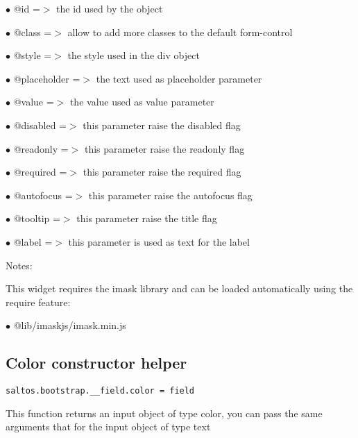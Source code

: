 \documentclass[a4paper]{book}
\begin{document}
\begin{compactitem}
\item[\color{myblue}$\bullet$] @id          =$>$ the id used by the object
\item[\color{myblue}$\bullet$] @class       =$>$ allow to add more classes to the default form-control
\item[\color{myblue}$\bullet$] @style       =$>$ the style used in the div object
\item[\color{myblue}$\bullet$] @placeholder =$>$ the text used as placeholder parameter
\item[\color{myblue}$\bullet$] @value       =$>$ the value used as value parameter
\item[\color{myblue}$\bullet$] @disabled    =$>$ this parameter raise the disabled flag
\item[\color{myblue}$\bullet$] @readonly    =$>$ this parameter raise the readonly flag
\item[\color{myblue}$\bullet$] @required    =$>$ this parameter raise the required flag
\item[\color{myblue}$\bullet$] @autofocus   =$>$ this parameter raise the autofocus flag
\item[\color{myblue}$\bullet$] @tooltip     =$>$ this parameter raise the title flag
\item[\color{myblue}$\bullet$] @label       =$>$ this parameter is used as text for the label
\end{compactitem}

Notes:

This widget requires the imask library and can be loaded automatically using the require
feature:

\begin{compactitem}
\item[\color{myblue}$\bullet$] @lib/imaskjs/imask.min.js
\end{compactitem}

\hypertarget{toc439}{}
\subsection{Color constructor helper}

\begin{lstlisting}
saltos.bootstrap.__field.color = field
\end{lstlisting}

This function returns an input object of type color, you can pass the same
arguments that for the input object of type text
\end{document}
